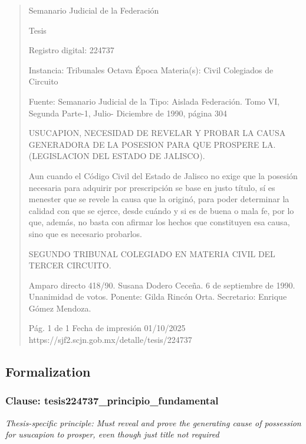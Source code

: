 \documentclass[11pt,a4paper]{article}
\begin{document}
\begin{quote}
                                                   Semanario Judicial de la Federación

                                                  Tesis

 Registro digital: 224737

 Instancia: Tribunales            Octava Época                         Materia(s): Civil
 Colegiados de Circuito

                                  Fuente: Semanario Judicial de la     Tipo: Aislada
                                  Federación.
                                  Tomo VI, Segunda Parte-1, Julio-
                                  Diciembre de 1990, página 304


USUCAPION, NECESIDAD DE REVELAR Y PROBAR LA CAUSA GENERADORA DE LA
POSESION PARA QUE PROSPERE LA. (LEGISLACION DEL ESTADO DE JALISCO).


Aun cuando el Código Civil del Estado de Jalisco no exige que la posesión necesaria para adquirir
por prescripción se base en justo título, sí es menester que se revele la causa que la originó, para
poder determinar la calidad con que se ejerce, desde cuándo y si es de buena o mala fe, por lo que,
además, no basta con afirmar los hechos que constituyen esa causa, sino que es necesario
probarlos.

SEGUNDO TRIBUNAL COLEGIADO EN MATERIA CIVIL DEL TERCER CIRCUITO.


Amparo directo 418/90. Susana Dodero Ceceña. 6 de septiembre de 1990. Unanimidad de votos.
Ponente: Gilda Rincón Orta. Secretario: Enrique Gómez Mendoza.




                                             Pág. 1 de 1             Fecha de impresión 01/10/2025
  https://sjf2.scjn.gob.mx/detalle/tesis/224737

\end{quote}

\subsection{Formalization}

\subsubsection{Clause: tesis224737\_principio\_fundamental}

\textit{Thesis-specific principle: Must reveal and prove the generating cause of possession for usucapion to prosper, even though just title not required}
\end{document}
